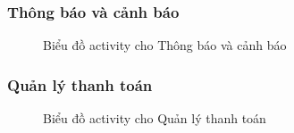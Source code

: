 \subsubsection{Thông báo và cảnh báo}
\begin{figure}[H]
    \centering
     
    \vspace{0.5cm}
    \caption{Biểu đồ activity cho Thông báo và cảnh báo}
    \label{fig:enter-label}
\end{figure}
\subsubsection{Quản lý thanh toán}
\begin{figure}[H]
    \centering
     
    \vspace{0.5cm}
    \caption{Biểu đồ activity cho Quản lý thanh toán}
    \label{fig:enter-label}
\end{figure}
